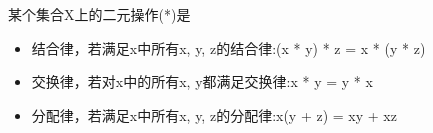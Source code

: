 某个集合X上的二元操作(*)是

\begin{itemize}
\item 
结合律，若满足x中所有x, y, z的结合律:(x * y) * z = x * (y * z)

\item 
交换律，若对x中的所有x, y都满足交换律:x * y = y * x

\item 
分配律，若满足x中所有x, y, z的分配律:x(y + z) = xy + xz
\end{itemize}